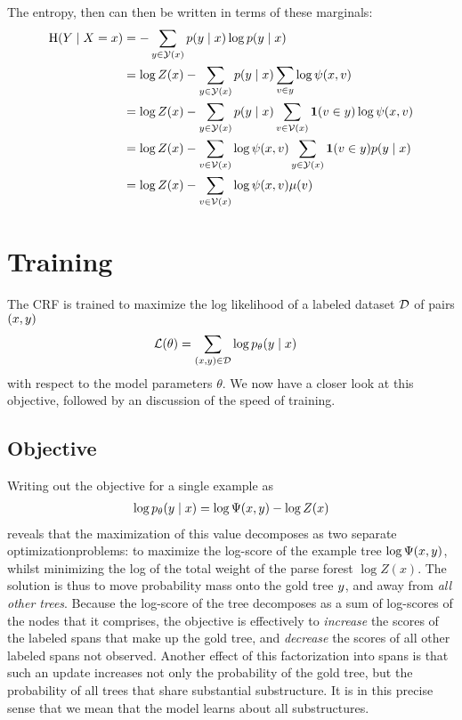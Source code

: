       The entropy, then can then be written in terms of these marginals:
      \begin{align}
        \label{eq:crf-entropy}
        \operatorname{H}(Y \mid X = x)
          &= - \sum_{ y \in \mathcal{Y}(x) } p(y \mid x) \log p(y \mid x)  \nonumber \\
          &= \log Z(x) - \sum_{ y \in \mathcal{Y}(x) } p(y \mid x) \sum_{v \in y} \log \psi(x, v)  \nonumber \\
          &= \log Z(x) - \sum_{ y \in \mathcal{Y}(x) } p(y \mid x) \sum_{ v \in \mathcal{V}(x) } \operatorname{\mathbf{1}}( v \in y ) \log \psi(x, v)  \nonumber \\
          &= \log Z(x) - \sum_{ v \in \mathcal{V}(x) } \log \psi(x, v)  \sum_{ y \in \mathcal{Y}(x) } \operatorname{\mathbf{1}}( v \in y ) p(y \mid x)  \nonumber \\
          &= \log Z(x) - \sum_{ v \in \mathcal{V}(x) } \log \psi(x, v) \mu(v)
      \end{align}

\section{Training}
  The CRF is trained to maximize the log likelihood of a labeled dataset $\mathcal{D}$ of pairs $(x, y)$
  \begin{align*}
    \mathcal{L}(\theta)
      &= \sum_{(x, y) \in \mathcal{D}} \log p_{\theta}(y \mid x)
  \end{align*}
  with respect to the model parameters $\theta$. We now have a closer look at this objective, followed by an discussion of the speed of training.

  \subsection{Objective}
    Writing out the objective for a single example as
    \begin{align*}
      \log p_{\theta}(y \mid x) = \log \Psi(x, y) - \log Z(x)
    \end{align*}
    reveals that the maximization of this value decomposes as two separate optimizationproblems: to maximize the log-score of the example tree $\log \Psi(x, y)$, whilst minimizing the log of the total weight of the parse forest $\log Z(x)$. The solution is thus to move probability mass onto the gold tree $y$, and away from \textit{all other trees}. Because the log-score of the tree decomposes as a sum of log-scores of the nodes that it comprises, the objective is effectively to \textit{increase} the scores of the labeled spans that make up the gold tree, and \textit{decrease} the scores of all other labeled spans not observed. Another effect of this factorization into spans is that such an update increases not only the probability of the gold tree, but the probability of all trees that share substantial substructure. It is in this precise sense that we mean that the model learns about all substructures.


